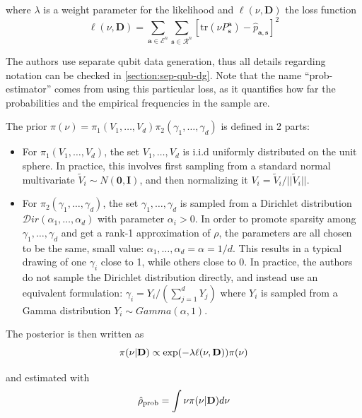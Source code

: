 \documentclass[12pt]{memoir}
\newcommand{\tr}{\text{tr}}
\newcommand{\mb}{\mathbf}
\newcommand{\tb}{\textbf}
\begin{document}
where $\lambda$ is a weight parameter for the likelihood and $\ell(\nu, \mb D)$ the loss function
\begin{equation}
    \ell(\nu, \mb D) = \sum_{\mb a \in \mathcal{E}^n} \sum_{\mb s \in \mathcal{R}^n} \left[\tr(\nu P^{\mb a}_{\mb s}) - \hat p_{\mb a,\mb s}\right]^2
\end{equation}\medbreak

The authors use separate qubit data generation, thus all details regarding notation can be checked in \ref{section:sep-qub-dg}. Note that the name ``prob-estimator'' comes from using this particular loss, as it quantifies how far the probabilities and the
empirical frequencies in the sample are.\medbreak 

The prior $\pi(\nu) = \pi_1(V_1, \dots, V_d) \pi_2(\gamma_1, \dots, \gamma_d)$ is defined in 2 parts:

\begin{itemize}
    \item For $\pi_1(V_1, \dots, V_d)$, the set $V_1, \dots, V_d$ is i.i.d uniformly distributed on the unit sphere. In practice, this involves first sampling from a standard normal multivariate $\tilde V_i \sim N(\mb 0, \mb I)$, and then normalizing it $V_i = \tilde V_i/||\tilde V_i||$.
    \item For $\pi_2(\gamma_1, \dots, \gamma_d)$, the set $\gamma_1,\dots,\gamma_d$ is sampled from a Dirichlet distribution $\mathcal{D}ir(\alpha_1,\dots,\alpha_d)$ with parameter $\alpha_i > 0$. In order to promote sparsity among $\gamma_1, \dots, \gamma_d$ and get a rank-1 approximation of $\rho$, the parameters are all chosen to be the same, small value: $\alpha_1,\dots,\alpha_d = \alpha = 1/d$. This results in a typical drawing of one $\gamma_i$ close to 1, while others close to 0. In practice, the authors do not sample the Dirichlet distribution directly, and instead use an equivalent formulation: $\gamma_i = Y_i/(\sum_{j=1}^{d} Y_j)$ where $Y_i$ is sampled from a Gamma distribution $Y_i \sim Gamma(\alpha, 1)$.  

\end{itemize}

The posterior is then written as
\begin{equation}
    \pi(\nu|\tb D) \propto \exp(-\lambda\ell(\nu, \mb D)) \pi(\nu)
\end{equation}

and estimated with
\begin{equation}
    \hat \rho_{\text{prob}} = \int \nu \pi(\nu|\tb D) d\nu
\end{equation}
\end{document}

